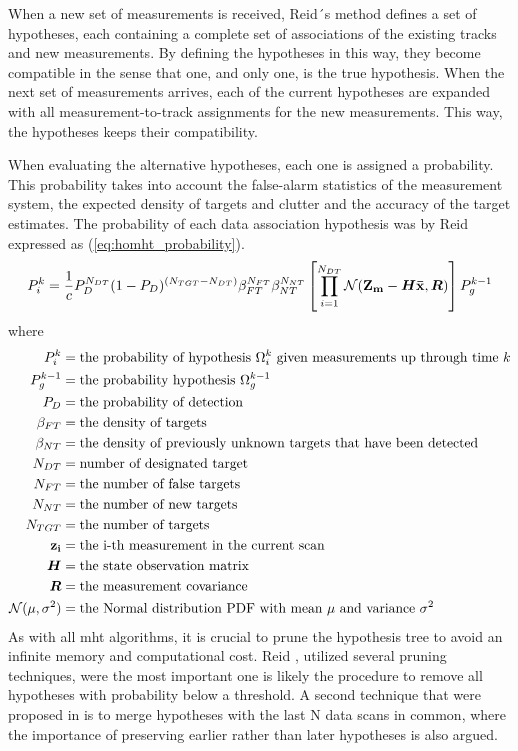 When a new set of \glspl{measurement} is received, Reid´s method \cite{Reid1979} defines a set of hypotheses, each containing a complete set of associations of the existing tracks and new \glspl{measurement}. By defining the hypotheses in this way, they become compatible in the sense that one, and only one, is the true hypothesis. When the next set of \glspl{measurement} arrives, each of the current hypotheses are expanded with all measurement-to-track assignments for the new \glspl{measurement}. This way, the hypotheses keeps their compatibility.

When evaluating the alternative hypotheses, each one is assigned a probability. This probability takes into account the false-alarm statistics of the measurement system, the expected density of \glspl{target} and clutter and the accuracy of the \gls{target} estimates. The probability of each data association hypothesis was by Reid \cite{Reid1979} expressed as (\ref{eq:homht_probability}).
\begin{equation}
P_i^k = \frac{1}{c} P_D^{N_{DT}}(1-P_D)^{(N_{TGT}-N_{DT})} \beta_{FT}^{N_{FT}} \beta_{NT}^{N_{NT}} \left[ \prod_{i
=1}^{N_{DT}} \mathcal{N}(\boldsymbol{\mathbf{Z_m}}-\bm{H}\boldsymbol{\mathbf{\bar{x}}},\bm{R}) \right] P_g^{k-1}
\label{eq:homht_probability}
\end{equation}
where 
\begin{equation*}
\begin{split}
	P_i^k		&= \text{the probability of hypothesis $\Omega_i^k$ given measurements up through time $k$} \\
	P_g^{k-1}	&= \text{the probability hypothesis $\Omega_g^{k-1}$} \\
	P_D 		&= \text{the probability of detection} \\
	\beta_{FT} 	&= \text{the density of targets} \\ 
	\beta_{NT}	&= \text{the density of previously unknown targets that have been detected} \\
	N_{DT} 		&=	\text{number of designated target} \\
	N_{FT} 		&= \text{the number of false targets} \\
	N_{NT} 		&= \text{the number of new targets} \\
	N_{TGT} 	&= \text{the number of targets} \\
	\boldsymbol{\mathbf{z_i}} 	&= \text{the i-th measurement in the current scan} \\
	\bm{H} 		&= \text{the state observation matrix} \\
	\bm{R} 		&= \text{the measurement covariance} \\
	\mathcal{N}(\mu,\sigma^2) &= \text{the Normal distribution PDF with mean $\mu$ and variance $\sigma^2$}
\end{split}
\end{equation*}
As with all \gls{mht} algorithms, it is crucial to prune the hypothesis tree to avoid an infinite memory and computational cost. Reid \cite{Reid1979}, utilized several pruning techniques, were the most important one is likely the procedure to remove all hypotheses with probability below a threshold. A second technique that were proposed in \cite{Reid1979} is to merge hypotheses with the last N data scans in common, where the importance of preserving earlier rather than later hypotheses is also argued.

